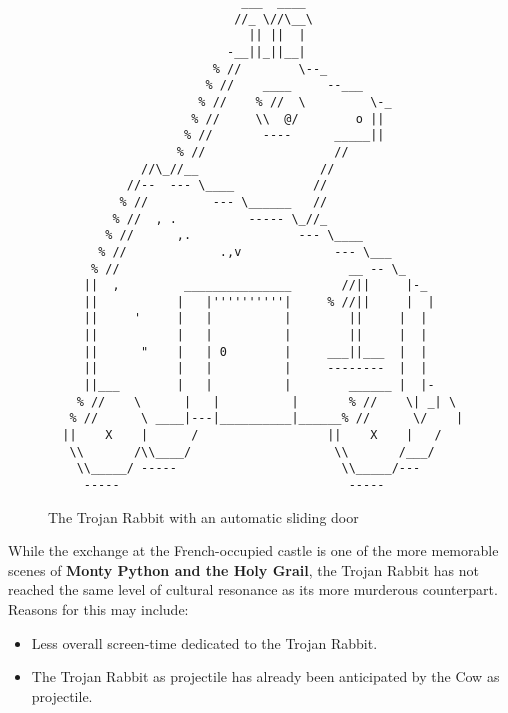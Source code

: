 \documentclass{metanorma}
\newenvironment{aside}{}{}
\begin{document}
\begin{figure}
  \label{trojan-rabbit}
  \caption{The Trojan Rabbit with an automatic sliding door}
  \begin{verbatim}
                           ___  ____
                          //_ \//\__\
                            || ||  |
                         -__||_||__|
                       % //        \--_
                      % //    ____     --___
                     % //    % //  \         \-_
                    % //     \\  @/        o ||
                   % //       ----      _____||
                  % //                  //
             //\_//__                 //
           //--  --- \____           //
          % //         --- \______   //
         % //  , .          ----- \_//_
        % //      ,.               --- \____
       % //             .,v             --- \___
      % //                                __ -- \_
     ||  ,         _______________       //||     |-_
     ||           |   |''''''''''|     % //||     |  |
     ||     '     |   |          |        ||     |  |
     ||           |   |          |        ||     |  |
     ||      "    |   | 0        |     ___||___  |  |
     ||           |   |          |     --------  |  |
     ||___        |   |          |        ______ |  |-
    % //    \      |   |          |       % //    \| _| \
   % //      \ ____|---|__________|______% //      \/    |
  ||    X    |      /                  ||    X    |   /
   \\       /\\____/                    \\       /___/
    \\_____/ -----                       \\_____/---
     -----                                -----
  \end{verbatim}
\end{figure}


\begin{aside}
While the exchange at the French-occupied castle is one of
the more memorable scenes of 
\textbf{Monty Python and the Holy Grail},
the Trojan Rabbit has not reached the same level of cultural
resonance as its more murderous counterpart. Reasons for this
may include:

\begin{itemize}
  \item Less overall screen-time dedicated to the Trojan Rabbit.

  \item The Trojan Rabbit as projectile has already been anticipated
  by the Cow as projectile.
\end{itemize}
\end{aside}
\end{document}
